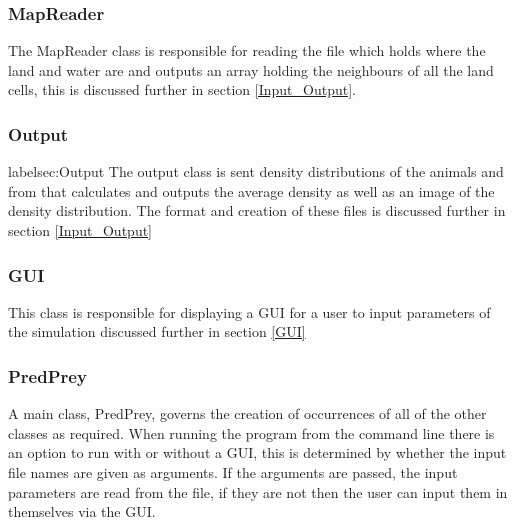 \documentclass[11pt]{report}
\begin{document}
\subsubsection{MapReader}
\label{sec:MapReader}
The MapReader class is responsible for reading the file which holds where the land and water are and outputs an array holding the neighbours of all the land cells, this is discussed further in section \ref{Input_Output}.

\subsubsection{Output}
label{sec:Output}
The output class is sent density distributions of the animals and from that calculates and outputs the average density as well as an image of the density distribution. The format and creation of these files is discussed further in section \ref{Input_Output}

\subsubsection{GUI}
\label{sec:GUI}
This class is responsible for displaying a GUI for a user to input parameters of the simulation discussed further in section \ref{GUI}


\subsubsection{PredPrey}
\label{sec:PredPrey}
 A main class, PredPrey, governs the creation of occurrences of all of the other classes as required. When running the program from the command line there is an option to run with or without a GUI, this is determined by whether the input file names are given as arguments. If the arguments are passed, the input parameters are read from the file, if they are not then the user can input them in themselves via the GUI.
\end{document}
